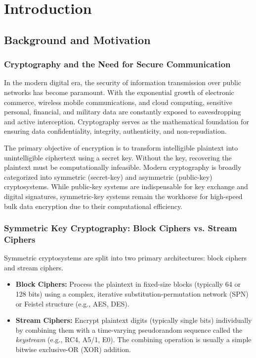 \chapter{Introduction}
\label{ch:introduction}

\section{Background and Motivation}
\label{sec:bg_motivation}

\subsection{Cryptography and the Need for Secure Communication}
In the modern digital era, the security of information transmission over public networks has become paramount. With the exponential growth of electronic commerce, wireless mobile communications, and cloud computing, sensitive personal, financial, and military data are constantly exposed to eavesdropping and active interception. Cryptography serves as the mathematical foundation for ensuring data confidentiality, integrity, authenticity, and non-repudiation. 

The primary objective of encryption is to transform intelligible plaintext into unintelligible ciphertext using a secret key. Without the key, recovering the plaintext must be computationally infeasible. Modern cryptography is broadly categorized into symmetric (secret-key) and asymmetric (public-key) cryptosystems. While public-key systems are indispensable for key exchange and digital signatures, symmetric-key systems remain the workhorse for high-speed bulk data encryption due to their computational efficiency.

\subsection{Symmetric Key Cryptography: Block Ciphers vs. Stream Ciphers}
Symmetric cryptosystems are split into two primary architectures: block ciphers and stream ciphers. 
\begin{itemize}
    \item \textbf{Block Ciphers:} Process the plaintext in fixed-size blocks (typically 64 or 128 bits) using a complex, iterative substitution-permutation network (SPN) or Feistel structure (e.g., AES, DES).
    \item \textbf{Stream Ciphers:} Encrypt plaintext digits (typically single bits) individually by combining them with a time-varying pseudorandom sequence called the \textit{keystream} (e.g., RC4, A5/1, E0). The combining operation is usually a simple bitwise exclusive-OR (XOR) addition.
\end{itemize}

